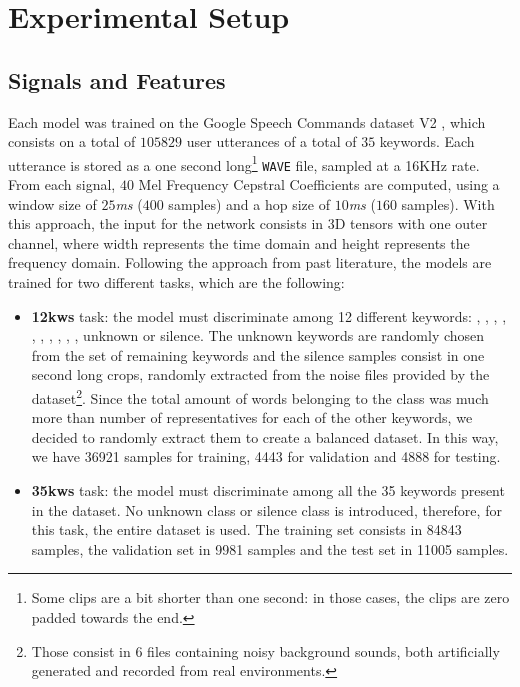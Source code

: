 \section{Experimental Setup}

\subsection{Signals and Features}
\label{sec:sig&features}


Each model was trained on the Google Speech Commands dataset V2 \cite{speechdataset2018warden}, which consists on a total of $105829$ user utterances of a total of $35$ keywords. Each utterance is stored as a one second long\footnote{Some clips are a bit shorter than one second: in those cases, the clips are zero padded towards the end.} \verb|WAVE| file, sampled at a 16KHz rate. From each signal, $40$ Mel Frequency Cepstral Coefficients are computed, using a window size of $25$\textit{ms} ($400$ samples) and a hop size of $10$\textit{ms} ($160$ samples). With this approach, the input for the network consists in 3D tensors with one outer channel, where width represents the time domain and height represents the frequency domain. Following the approach from past literature, the models are trained for two different tasks, which are the following:
\begin{itemize}
	\item \textbf{12kws} task: the model must discriminate among 12 different keywords: , , , , , , , , , , unknown or silence. The unknown keywords are randomly chosen from the set of remaining keywords and the silence samples consist in one second long crops, randomly extracted from the noise files provided by the dataset\footnote{Those consist in 6 files containing noisy background sounds, both artificially generated and recorded from real environments.}. Since the total amount of words belonging to the  class was much more than number of representatives for each of the other keywords, we decided to randomly extract them to create a balanced dataset. In this way, we have 36921 samples for training, 4443 for validation and 4888 for testing.
	\item \textbf{35kws} task: the model must discriminate among all the 35 keywords present in the dataset. No unknown class or silence class is introduced, therefore, for this task, the entire dataset is used. The training set consists in 84843 samples, the validation set in 9981 samples and the test set in 11005 samples. 
\end{itemize}

